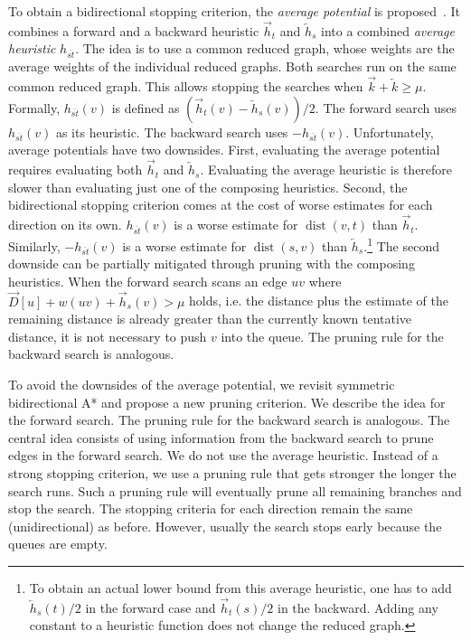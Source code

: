 \documentclass[manuscript,review]{acmart}
\newcommand*{\dist}{\operatorname{dist}}
\begin{document}
To obtain a bidirectional stopping criterion, the \emph{average potential} is proposed~\cite{gh-cspas-05}.
It combines a forward and a backward heuristic $\overrightarrow{h}_t$ and $\overleftarrow{h}_s$ into a combined \emph{average heuristic} $h_{\overline{st}}$.
The idea is to use a common reduced graph, whose weights are the average weights of the individual reduced graphs.
Both searches run on the same common reduced graph.
This allows stopping the searches when $\overrightarrow{k} + \overleftarrow{k} \geq \mu$.
Formally, $h_{\overline{st}}(v)$ is defined as $(\overrightarrow{h}_t(v) - \overleftarrow{h}_s(v))/2$.
The forward search uses $h_{\overline{st}}(v)$ as its heuristic.
The backward search uses $-h_{\overline{st}}(v)$.
Unfortunately, average potentials have two downsides.
First, evaluating the average potential requires evaluating both $\overrightarrow{h}_t$ and $\overleftarrow{h}_s$.
Evaluating the average heuristic is therefore slower than evaluating just one of the composing heuristics.
Second, the bidirectional stopping criterion comes at the cost of worse estimates for each direction on its own.
$h_{\overline{st}}(v)$ is a worse estimate for $\dist(v,t)$ than $\overrightarrow{h}_t$.
Similarly, $-h_{\overline{st}}(v)$ is a worse estimate for $\dist(s,v)$ than $\overleftarrow{h}_s$.\footnote{
To obtain an actual lower bound from this average heuristic, one has to add $\overleftarrow{h}_s(t)/2$ in the forward case and $\overrightarrow{h}_t(s)/2$ in the backward.
Adding any constant to a heuristic function does not change the reduced graph.
}
The second downside can be partially mitigated through pruning with the composing heuristics.
When the forward search scans an edge $uv$ where $\overrightarrow{D}[u] + w(uv) + \overrightarrow{h}_s(v) > \mu$ holds, i.e. the distance plus the estimate of the remaining distance is already greater than the currently known tentative distance, it is not necessary to push $v$ into the queue.
The pruning rule for the backward search is analogous.

To avoid the downsides of the average potential, we revisit symmetric bidirectional A* and propose a new pruning criterion.
We describe the idea for the forward search.
The pruning rule for the backward search is analogous.
The central idea consists of using information from the backward search to prune edges in the forward search.
We do not use the average heuristic.
Instead of a strong stopping criterion, we use a pruning rule that gets stronger the longer the search runs.
Such a pruning rule will eventually prune all remaining branches and stop the search.
The stopping criteria for each direction remain the same (unidirectional) as before.
However, usually the search stops early because the queues are empty.
\end{document}
